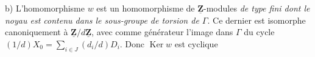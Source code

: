 \documentclass[11pt,a4paper]{article}
\begin{document}
b) L'homomorphisme $w$ est un homomorphisme de $\underline{\mathbf{Z}}$-modules
\emph{de type fini dont le noyau est contenu dans le sous-groupe de torsion de
$\Gamma$}. Ce dernier est isomorphe canoniquement à
$\underline{\mathbf{Z}}/d\underline{\mathbf{Z}}$, avec comme générateur l'image dans
$\Gamma$ du cycle $(1/d)X_0 = \sum_{i \in J} (d_i/d) D_i$. Donc
$\operatorname{Ker} w$ est cyclique
\end{document}
